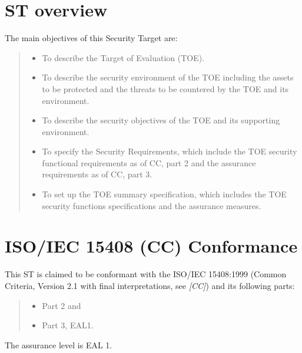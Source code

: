 \documentclass[12pt,english]{scrbook}
\begin{document}
\section{ST overview}

The main objectives of this Security Target are:
\begin{quote}
\begin{itemize}
\item {} 
To describe the Target of Evaluation (TOE).

\item {} 
To describe the security environment of the TOE including the assets to
be protected and the threats to be countered by the TOE and its
environment.

\item {} 
To describe the security objectives of the TOE and its supporting
environment.

\item {} 
To specify the Security Requirements, which include the TOE security
functional requirements as of CC, part 2 and the assurance requirements as
of CC, part 3.

\item {} 
To set up the TOE summary specification, which includes the TOE
security functions specifications and the assurance measures.

\end{itemize}
\end{quote}





\section{ISO/IEC 15408 (CC) Conformance}

This ST is claimed to be conformant with the ISO/IEC 15408:1999 (Common
Criteria, Version 2.1 with final interpretations, see \emph{{[}CC]}) and its following
parts:
\begin{quote}
\begin{itemize}
\item {} 
Part 2 and

\item {} 
Part 3, EAL1.

\end{itemize}
\end{quote}

The assurance level is EAL 1.
\end{document}
